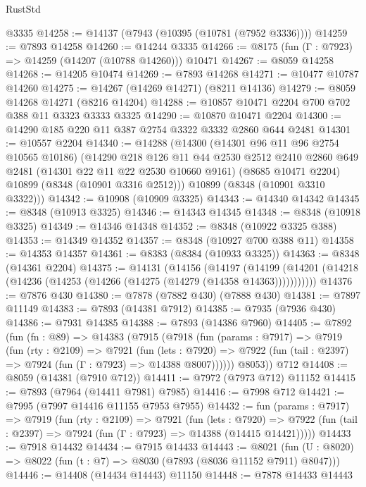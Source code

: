 \begin{lexlean}{RustStd}
\begin{coremodule}
{\begin{coremodule}
{{{{{{{{{{{{{{{{{{{{{{{{{{{{{{{{{{{{{{{{{{{{{{{{{{    @3335
@14258 := @14137 (@7943 (@10395 (@10781 (@7952 @3336))))
@14259 := @7893 @14258
@14260 := @14244 @3335
@14266 := @8175 (fun (Γ : @7923) => @14259 (@14207 (@10788 @14260))) @10471
@14267 := @8059 @14258
@14268 := @14205 @10474
@14269 := @7893 @14268
@14271 := @10477 @10787 @14260
@14275 := @14267 (@14269 @14271) (@8211 @14136)
@14279 := @8059 @14268 @14271 (@8216 @14204)
@14288 := @10857 @10471 @2204 @700 @702 @388 @11 @3323 @3333 @3325
@14290 := @10870 @10471 @2204
@14300 := @14290 @185 @220 @11 @387 @2754 @3322 @3332 @2860 @644 @2481
@14301 := @10557 @2204
@14340 := @14288
    (@14300
      (@14301 @96 @11 @96 @2754 @10565 @10186)
      (@14290
        @218
        @126
        @11
        @44
        @2530
        @2512
        @2410
        @2860
        @649
        @2481
        (@14301 @22 @11 @22 @2530 @10660 @9161)
        (@8685 @10471 @2204)
        @10899
        (@8348 (@10901 @3316 @2512)))
      @10899
      (@8348 (@10901 @3310 @3322)))
@14342 := @10908 (@10909 @3325)
@14343 := @14340 @14342
@14345 := @8348 (@10913 @3325)
@14346 := @14343 @14345
@14348 := @8348 (@10918 @3325)
@14349 := @14346 @14348
@14352 := @8348 (@10922 @3325 @388)
@14353 := @14349 @14352
@14357 := @8348 (@10927 @700 @388 @11)
@14358 := @14353 @14357
@14361 := @8383 (@8384 (@10933 @3325))
@14363 := @8348 (@14361 @2204)
@14375 := @14131
    (@14156
      (@14197
        (@14199 (@14201 (@14218 (@14236 (@14253 (@14266 (@14275 (@14279 (@14358 @14363)))))))))))
@14376 := @7876 @430
@14380 := @7878 (@7882 @430) (@7888 @430)
@14381 := @7897 @11149
@14383 := @7893 (@14381 @7912)
@14385 := @7935 (@7936 @430)
@14386 := @7931 @14385
@14388 := @7893 (@14386 @7960)
@14405 := @7892
    (fun (fn : @89) =>
    @14383
      (@7915
        (@7918
          (fun (params : @7917) =>
          @7919
            (fun (rty : @2109) =>
            @7921
              (fun (lets : @7920) =>
              @7922 (fun (tail : @2397) => @7924 (fun (Γ : @7923) => @14388 @8007))))))
        @8053))
    @712
@14408 := @8059 (@14381 (@7910 @712))
@14411 := @7972 (@7973 @712) @11152
@14415 := @7893 (@7964 (@14411 @7981) @7985)
@14416 := @7998 @712
@14421 := @7995 (@7997 @14416 @11155 @7953 @7955)
@14432 := fun (params : @7917) =>
  @7919
    (fun (rty : @2109) =>
    @7921
      (fun (lets : @7920) =>
      @7922 (fun (tail : @2397) => @7924 (fun (Γ : @7923) => @14388 (@14415 @14421)))))
@14433 := @7918 @14432
@14434 := @7915 @14433
@14443 := @8021
    (fun (U : @8020) => @8022 (fun (t : @7) => @8030 (@7893 (@8036 @11152 @7911) @8047)))
@14446 := @14408 (@14434 @14443) @11150
@14448 := @7878 @14433 @14443
}}}}}}}}}}}}}}}}}}}}}}}}}}}}}}}}}}}}}}}}}}}}}}}}}}
\end{coremodule}}
\end{coremodule}
\end{lexlean}
